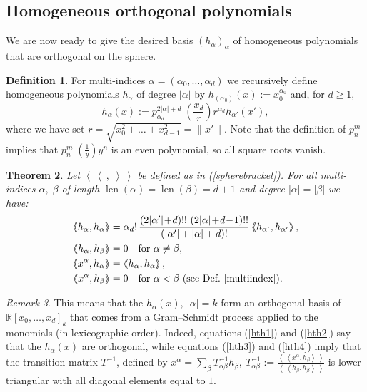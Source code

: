 \documentclass{amsart}
\DeclareMathOperator{\len}{len}
\newcommand{\p}[2]{p_{#1}^{#2}\;\!\!}
\newcommand{\coloneqq}{:=}
\newcommand{\bra}{\left<\!\!\!\:\left<}
\newcommand{\ket}{\right>\!\!\!\:\right>}
\newcommand{\R}{\mathbb{R}}
\theoremstyle{plain}
\newtheorem{theorem}{Theorem}[section]
\theoremstyle{definition}
\newtheorem{definition}[theorem]{Definition}
\theoremstyle{remark}
\newtheorem{remark}[theorem]{Remark}
\begin{document}
\subsection{Homogeneous orthogonal polynomials} \label{hsection}
We are now ready to give the desired basis $(h_\alpha)_\alpha$ of homogeneous polynomials that are orthogonal on the sphere. 
\begin{definition} \label{hdef}
For multi-indices $\alpha=(\alpha_0,\ldots,\alpha_d)$ we recursively define homogeneous polynomials $h_\alpha$ of degree $|\alpha |$ by $h_{(\alpha_0)}(x) \coloneqq x_0^{\alpha_0}$ and, for $d\geq 1$,
$$
h_\alpha(x) \coloneqq \p{\alpha_d}{2|\alpha |+d}\left(\frac{x_d}{r}\right) r^{\alpha_d}h_{\alpha'}(x'),
$$
where we have set $r=\sqrt{x_0^2 +\ldots+x_{d-1}^2}=\|x'\|$. Note that the definition of $\p{n}{m}$ implies that $\p{n}{m}(\frac{1}{y})y^n$ is an even polynomial, so all square roots vanish.
\end{definition}
\begin{theorem} Let $\bra\ ,\;\ket$ be defined as in (\ref{spherebracket}).
For all multi-indices $\alpha,\;\beta$ of length $\len(\alpha)=\len(\beta)=d+1$ and degree $|\alpha|=|\beta|$ we have:
\begin{align} \label{hth1}
\bra h_\alpha ,h_\alpha \ket &= \alpha_d!\,\frac{\left(2|\alpha '|\!+\!d\right)!!\,\left(2|\alpha |\!+\!d\!-\!1\right)!!}{\left(|\alpha '|+|\alpha |+d\right)!}\bra h_{\alpha '},h_{\alpha '}\ket ,\\
\label{hth2}
\bra h_\alpha,h_\beta \ket &= 0 \quad\text{for }\alpha\neq\beta,\\
\label{hth3}
\bra x^\alpha, h_\alpha \ket &= \bra h_\alpha ,h_\alpha \ket ,\\
\label{hth4}
\bra x^\alpha,h_\beta \ket &= 0 \quad\text{for }\alpha < \beta\ \text{(see Def.~\ref{multiindex})}.
\end{align}
\end{theorem}
\begin{remark}
This means that the $h_\alpha(x),\ |\alpha|=k$ form an orthogonal basis of $\R[x_0,\ldots,x_d]_k$ that comes from a Gram--Schmidt process applied to the monomials (in lexicographic order). Indeed, equations (\ref{hth1}) and (\ref{hth2}) say that the $h_\alpha(x)$ are orthogonal, while equations (\ref{hth3}) and (\ref{hth4}) imply that the transition matrix $T^{-1}$, defined by $ x^\alpha = \sum_\beta T^{-1}_{\alpha\beta}h_\beta,\ T^{-1}_{\alpha\beta} \coloneqq \frac{\bra x^\alpha,h_\beta\ket}{\bra h_\beta,h_\beta\ket} $ is lower triangular with all diagonal elements equal to $1$.
\end{remark}
\end{document}
